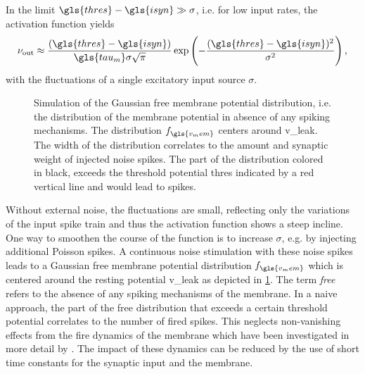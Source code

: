In the limit $\gls{thres} - \gls{isyn} \gg \sigma$, i.e. for low input rates, the activation function yields
\begin{equation}
\nu_\text{out} \approx \frac{(\gls{thres} - \gls{isyn})}{\gls{tau_m}\sigma \sqrt{\pi}} \exp\left(-\frac{(\gls{thres} - \gls{isyn})^2}{\sigma^2}\right),
\label{fireratelow}
\end{equation}
with the fluctuations of a single excitatory input source $\sigma$.

\begin{figure}[ht!]
	\begin{center}
		
	\end{center}
	\caption[Simulation of the Gaussian free membrane potential distribution.]{Simulation of the Gaussian free membrane potential distribution, i.e. the distribution of the membrane potential in absence of any spiking mechanisms. The distribution $f_{\gls{v_mem}}$ centers around \gls{v_leak}. The width of the distribution correlates to the amount and synaptic weight of injected noise spikes. The part of the distribution colored in black, exceeds the threshold potential \gls{thres} indicated by a red vertical line and would lead to spikes.}
	\label{theoretical_vleak_w_noise}
\end{figure}

Without external noise, the fluctuations are small, reflecting only the variations of the input spike train and thus the activation function shows a steep incline. One way to smoothen the course of the function is to increase $\sigma$, e.g. by injecting additional Poisson spikes. A continuous noise stimulation with these noise spikes leads to a Gaussian free membrane potential distribution $f_{\gls{v_mem}}$ which is centered around the resting potential \gls{v_leak} as depicted in \cref{theoretical_vleak_w_noise}. The term \emph{free} refers to the absence of any spiking mechanisms of the membrane. In a naive approach, the part of the free distribution that exceeds a certain threshold potential correlates to the number of fired spikes. This neglects non-vanishing effects from the fire dynamics of the membrane which have been investigated in more detail by \citealp{petrovici12phdthesis}. The impact of these dynamics can be reduced by the use of short time constants for the synaptic input and the membrane.

